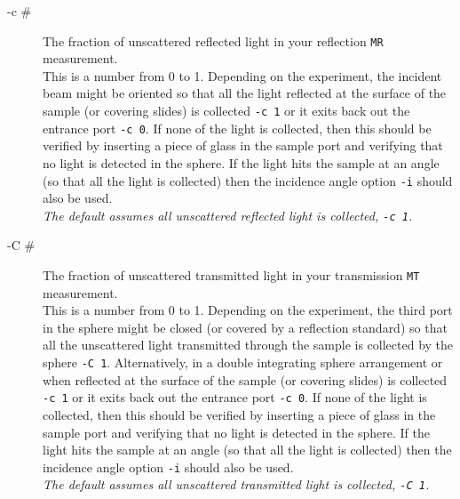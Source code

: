 \documentclass{article}
\begin{document}
\begin{description}
    \item[-c \#] The fraction of unscattered reflected light in your reflection \texttt{MR} measurement.\\[1mm]
                 This is a number from 0 to 1. Depending on the experiment, the incident beam might be oriented so that all the light
                 reflected at the surface of the sample (or covering slides) is collected \texttt{-c 1} or it exits
                 back out the entrance port \texttt{-c 0}.  If none of the light is collected, then this should be
                 verified by inserting a piece of glass in the sample port and verifying that no light is detected
                 in the sphere. If the light hits the sample at an angle (so that all the light is collected) then the 
                 incidence angle option \texttt{-i} should also be used.\\[1mm]
                 \textit{The default assumes all unscattered reflected light is collected, \texttt{-c 1}.}
                 
    \item[-C \#] The fraction of unscattered transmitted light in your transmission \texttt{MT} measurement.\\[1mm]
                 This is a number from 0 to 1. Depending on the experiment, the third port in the sphere might be
                 closed (or covered by a reflection standard) so that all the unscattered light transmitted through
                 the sample is collected by the sphere \texttt{-C 1}.  Alternatively, in a double integrating sphere
                 arrangement or when 
                 reflected at the surface of the sample (or covering slides) is collected \texttt{-c 1} or it exits
                 back out the entrance port \texttt{-c 0}.  If none of the light is collected, then this should be
                 verified by inserting a piece of glass in the sample port and verifying that no light is detected
                 in the sphere. If the light hits the sample at an angle (so that all the light is collected) then the 
                 incidence angle option \texttt{-i} should also be used.\\[1mm]
                 \textit{The default assumes all unscattered transmitted light is collected, \texttt{-C 1}.}
  

\end{description}
\end{document}
